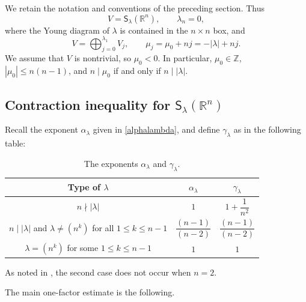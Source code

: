 \documentclass[reqno,11pt]{amsart}
\numberwithin{equation}{section}
\theoremstyle{definition}
\theoremstyle{remark}
\newcommand{\R}{\mathbb R}
\begin{document}
\medskip 
We retain the notation and conventions of the preceding section. Thus
$$
V={\mathsf S}_\lambda(\mathbb R^n),
\qquad \lambda_n=0,
$$
where the Young diagram of $\lambda$ is contained in the $n\times n$
box, and
$$
V=\bigoplus_{j=0}^{\lambda_1}V_j,
\qquad
\mu_j=\mu_0+nj=-|\lambda|+nj.
$$
We assume that $V$ is nontrivial, so $\mu_0<0$. In particular,
$\mu_0\in\mathbb Z$, $|\mu_0|\le n(n-1)$, and
$n\mid\mu_0$ if and only if $n\mid|\lambda|$.

\subsection{Contraction inequality for $\mathsf{S}_{\lambda}(\R^n)$}

Recall the exponent $\alpha_\lambda$ given in
\eqref{alphalambda}, and define
$\gamma_\lambda$ as in the following table:
\begin{table}[ht]
\centering
\begin{tabular}{ccc}
\toprule
Type of $\lambda$
& $\alpha_\lambda$
& $\gamma_\lambda$ \\
\midrule
$n\nmid|\lambda|$
& $1$
& $1+\dfrac{1}{n^2}$ \\
\midrule
$n\mid|\lambda|$ and $\lambda\neq(n^k)$ for all $1\le k\le n-1$
& $\dfrac{(n-1)}{(n-2)}$
& $\dfrac{(n-1)}{(n-2)}$ \\
\midrule
$\lambda=(n^k)$ for some $1\le k\le n-1$
& $1$
& $1$ \\
\bottomrule
\end{tabular}
\caption{The exponents $\alpha_\lambda$ and $\gamma_\lambda$.}
\label{tab:alpha-gamma}
\end{table}

As noted in , the second case does not occur when $n=2$.

The main one-factor estimate is the following.
\end{document}
